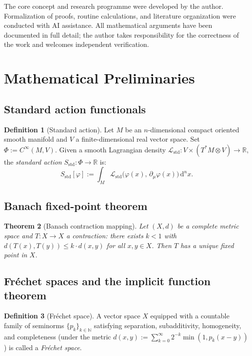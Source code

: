 \documentclass[12pt,letterpaper]{article}
\newtheorem{theorem}{Theorem}[section]
\theoremstyle{definition}
\newtheorem{definition}[theorem]{Definition}
\newcommand{\mL}{\mathcal{L}}
\newcommand{\mPhi}{\Phi}
\newcommand{\R}{\mathbb{R}}
\newcommand{\N}{\mathbb{N}}
\newcommand{\diff}{\mathrm{d}}
\newcommand{\dVol}{\,\diff^n x}
\begin{document}
The core concept and research programme were developed by the author. Formalization of proofs, routine calculations, and literature organization were conducted with AI assistance. All mathematical arguments have been documented in full detail; the author takes responsibility for the correctness of the work and welcomes independent verification.

\section{Mathematical Preliminaries}
\label{sec:prelim}

\subsection{Standard action functionals}

\begin{definition}[Standard action]
\label{def:std-action}
Let $M$ be an $n$-dimensional compact oriented smooth manifold and $V$ a finite-dimensional real vector space. Set $\mPhi := C^\infty(M, V)$. Given a smooth Lagrangian density $\mL_{\mathrm{std}}: V \times (T^*M \otimes V) \to \R$, the \emph{standard action} $S_{\mathrm{std}}: \mPhi \to \R$ is:
\[ S_{\mathrm{std}}[\varphi] := \int_M \mL_{\mathrm{std}}\!\bigl(\varphi(x),\, \partial_\mu\varphi(x)\bigr) \dVol. \]
\end{definition}

\subsection{Banach fixed-point theorem}

\begin{theorem}[Banach contraction mapping]
\label{thm:banach}
Let $(X, d)$ be a complete metric space and $T: X \to X$ a contraction: there exists $k < 1$ with $d(T(x), T(y)) \le k \cdot d(x, y)$ for all $x, y \in X$. Then $T$ has a unique fixed point in $X$.
\end{theorem}

\subsection{Fr\'echet spaces and the implicit function theorem}

\begin{definition}[Fr\'echet space]
A vector space $X$ equipped with a countable family of seminorms $\{p_k\}_{k \in \N}$ satisfying separation, subadditivity, homogeneity, and completeness (under the metric $d(x, y) := \sum_{k=0}^\infty 2^{-k} \min(1, p_k(x - y))$) is called a \emph{Fr\'echet space}.
\end{definition}
\end{document}

